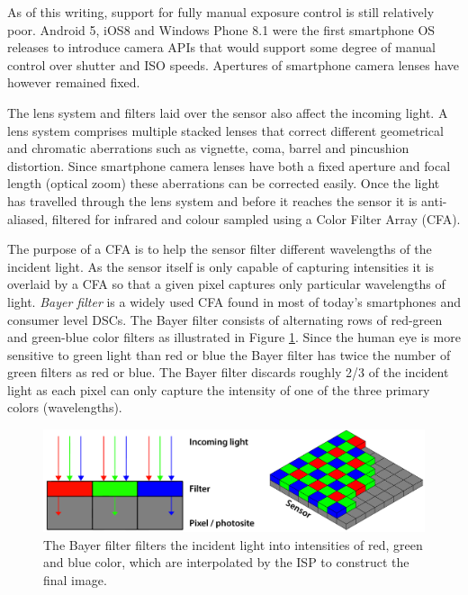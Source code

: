 \documentclass[thesis.tex]{subfiles}
\begin{document}
As of this writing, support for fully manual exposure control is still relatively poor. Android 5, iOS8 and Windows Phone 8.1 were the first smartphone OS releases to introduce camera APIs that would support some degree of manual control over shutter and ISO speeds. Apertures of smartphone camera lenses have however remained fixed.

The lens system and filters laid over the sensor also affect the incoming light. A lens system comprises multiple stacked lenses that correct different geometrical and chromatic aberrations such as vignette, coma, barrel and pincushion distortion. Since smartphone camera lenses have both a fixed aperture and focal length (optical zoom) these aberrations can be corrected easily. \cite{color_pipeline} Once the light has travelled through the lens system and before it reaches the sensor it is anti-aliased, filtered for infrared and colour sampled using a Color Filter Array (CFA).

The purpose of a CFA is to help the sensor filter different wavelengths of the incident light. As the sensor itself is only capable of capturing intensities it is overlaid by a CFA so that a given pixel captures only particular wavelengths of light. \textit{Bayer filter} is a widely used CFA found in most of today's smartphones and consumer level DSCs. The Bayer filter consists of alternating rows of red-green and green-blue color filters as illustrated in Figure \ref{figure:bayer}. Since the human eye is more sensitive to green light than red or blue the Bayer filter has twice the number of green filters as red or blue. The Bayer filter discards roughly 2/3 of the incident light as each pixel can only capture the intensity of one of the three primary colors (wavelengths).

\begin{figure}[h]
\centering \includegraphics[width=\textwidth]{images/bayer}
\caption{The Bayer filter filters the incident light into intensities of red, green and blue color, which are interpolated by the ISP to construct the final image. \label{figure:bayer}}
\end{figure}
\end{document}
